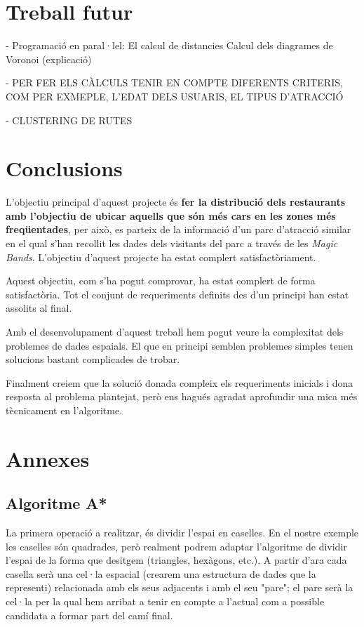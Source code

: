 \documentclass[12pt]{article}
\begin{document}
\clearpage
\section{Treball futur}
- Programació en paral·lel:
	El calcul de distancies
	Calcul dels diagrames de Voronoi (explicació)

- PER FER ELS CÀLCULS TENIR EN COMPTE DIFERENTS CRITERIS, COM PER EXMEPLE, L'EDAT DELS USUARIS, EL TIPUS D'ATRACCIÓ

- CLUSTERING DE RUTES

\clearpage
\section{Conclusions}

L'objectiu principal d'aquest projecte és \textbf{fer la distribució dels restaurants amb l'objectiu de ubicar aquells que són més cars en les zones més freqüentades}, per això, es parteix de la informació d'un parc d'atracció similar en el qual s'han recollit les dades dels visitants del parc a través de les \textit{Magic Bands}. L'objectiu d'aquest projecte ha estat complert satisfactòriament. 

Aquest objectiu, com s’ha pogut comprovar, ha estat complert de forma satisfactòria. Tot el conjunt de requeriments definits des d’un principi han estat assolits al final.

Amb el desenvolupament d’aquest treball hem pogut veure la complexitat dels problemes de dades espaials. El que en principi semblen problemes simples tenen solucions bastant complicades de trobar.

Finalment creiem que la solució donada compleix els requeriments inicials i dona resposta al problema plantejat, però ens hagués agradat aprofundir una mica més tècnicament en l’algoritme.

\clearpage
\section{Annexes}
\subsection{Algoritme A*}
La primera operació a realitzar, és dividir l'espai en caselles. En el nostre exemple les caselles són quadrades, però realment podrem adaptar l'algoritme de dividir l'espai de la forma que desitgem (triangles, hexàgons, etc.). A partir d'ara cada casella serà una cel·la espacial (crearem una estructura de dades que la representi) relacionada amb els seus adjacents i amb el seu "pare"; el pare serà la cel·la per la qual hem arribat a tenir en compte a l'actual com a possible candidata a formar part del camí final.
\end{document}
